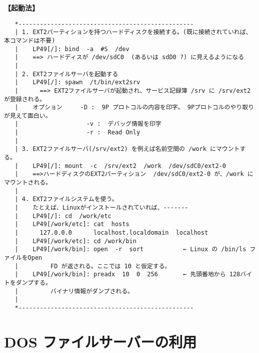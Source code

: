 {\bf 【起動法】}
\begin{verbatim}
   *-------------------------------------------------
   | 1. EXT2パーティションを持つハードディスクを接続する。(既に接続されていれば、本コマンドは不要)  
   |    LP49[/]: bind  -a  #S  /dev                                                                 
   |    ==> ハードディスが /dev/sdC0  (あるいは sdD0 ?) に見えるようになる
   |
   | 2. EXT2ファイルサーバを起動する                                                                
   |    LP49[/]: spawn  /t/bin/ext2srv                                                              
   |      ==> EXT2ファイルサーバが起動され、サービス記録簿 /srv に /srv/ext2 が登録される。         
   |    オプション     -D :  9P プロトコルの内容を印字。 9Pプロトコルのやり取りが見えて面白い。     
   |                   -v :  デバッグ情報を印字                                                     
   |                   -r :  Read Only 
   |
   | 3. EXT2ファイルサーバ(/srv/ext2) を例えば名前空間の /work にマウントする。                     
   |    LP49[/]: mount  -c  /srv/ext2  /work  /dev/sdC0/ext2-0                                      
   |    ==>ハードディスクのEXT2パーティション  /dev/sdC0/ext2-0 が、/work にマウントされる。        
   |   
   | 4. EXT2ファイルシステムを使う。                                                                
   |    たとえば、Linuxがインストールされていれば、-------                                          
   |    LP49[/]: cd  /work/etc                                                                      
   |    LP49[/work/etc]: cat  hosts                                                                 
   |      127.0.0.0      localhost.localdomain  localhost                                           
   |    LP49[/work/etc]: cd /work/bin                                                               
   |    LP49[/work/bin]: open  -r  sort           ← Linux の /bin/ls ファイルをOpen                 
   |         FD が返される。ここでは 10 と仮定する。                                                
   |    LP49[/work/bin]: preadx  10  0  256       ← 先頭番地から 128バイトをダンプする。            
   |         バイナリ情報がダンプされる。                                                           
   |                                                                                                
   *-------------------------------------------------
\end{verbatim}  


\chapter{DOS ファイルサーバーの利用}

